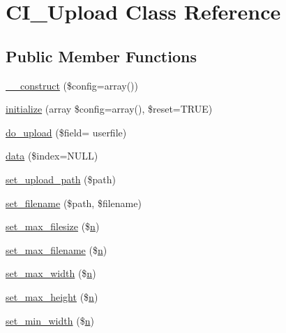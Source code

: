 \hypertarget{class_c_i___upload}{}\section{C\+I\+\_\+\+Upload Class Reference}
\label{class_c_i___upload}
\subsection*{Public Member Functions}
\begin{DoxyCompactItemize}
\item 
\hyperlink{class_c_i___upload_af7f9493844d2d66e924e3c1df51ce616}{\+\_\+\+\_\+construct} (\$config=array())
\item 
\hyperlink{class_c_i___upload_a58cef448bae0c178f3f675700b7e4413}{initialize} (array \$config=array(), \$reset=T\+R\+U\+E)
\item 
\hyperlink{class_c_i___upload_ad4cb1d2aafb3690018dfdeb09010a48c}{do\+\_\+upload} (\$field= \textquotesingle{}userfile\textquotesingle{})
\item 
\hyperlink{class_c_i___upload_afe56c7645362202d2f1c7b8f7da67f39}{data} (\$index=N\+U\+L\+L)
\item 
\hyperlink{class_c_i___upload_ab2407f3a942d9b203f54e21194cf040d}{set\+\_\+upload\+\_\+path} (\$path)
\item 
\hyperlink{class_c_i___upload_a4b09b3f2b57a8bafcac1700f43d12c36}{set\+\_\+filename} (\$path, \$filename)
\item 
\hyperlink{class_c_i___upload_a1f78c3a54f32d313294b27cde4eafaf4}{set\+\_\+max\+\_\+filesize} (\$\hyperlink{cli_2error__general_8php_ace0fd03cd383f20ce6ea63247a207294}{n})
\item 
\hyperlink{class_c_i___upload_aa288c7337b534788b32d66b23e25548e}{set\+\_\+max\+\_\+filename} (\$\hyperlink{cli_2error__general_8php_ace0fd03cd383f20ce6ea63247a207294}{n})
\item 
\hyperlink{class_c_i___upload_a4028f187a825a666976cc3fe47cd44a8}{set\+\_\+max\+\_\+width} (\$\hyperlink{cli_2error__general_8php_ace0fd03cd383f20ce6ea63247a207294}{n})
\item 
\hyperlink{class_c_i___upload_aaed82d431f5aeee6a0af294bc604a51e}{set\+\_\+max\+\_\+height} (\$\hyperlink{cli_2error__general_8php_ace0fd03cd383f20ce6ea63247a207294}{n})
\item 
\hyperlink{class_c_i___upload_afe47751e024dc9bf07333060628e0fb4}{set\+\_\+min\+\_\+width} (\$\hyperlink{cli_2error__general_8php_ace0fd03cd383f20ce6ea63247a207294}{n})

\end{DoxyCompactItemize}

